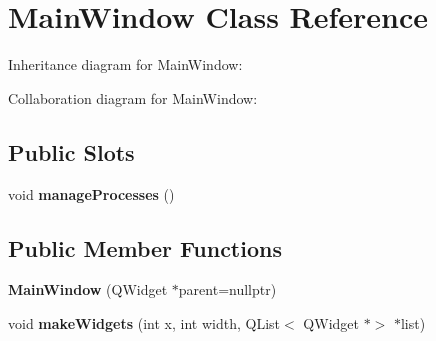 \hypertarget{classMainWindow}{}\section{Main\+Window Class Reference}
\label{classMainWindow}


Inheritance diagram for Main\+Window\+:


Collaboration diagram for Main\+Window\+:
\subsection*{Public Slots}
\begin{DoxyCompactItemize}
\item 
\mbox{\label{classMainWindow_a5a4608a59a2bfb0c1cb373a1c2ac57c7}} 
void {\bfseries manage\+Processes} ()
\end{DoxyCompactItemize}
\subsection*{Public Member Functions}
\begin{DoxyCompactItemize}
\item 
\mbox{\label{classMainWindow_a996c5a2b6f77944776856f08ec30858d}} 
{\bfseries Main\+Window} (Q\+Widget $\ast$parent=nullptr)
\item 
\mbox{\label{classMainWindow_ab6c133bd1931b9e71333e0acaffbaf75}} 
void {\bfseries make\+Widgets} (int x, int width, Q\+List$<$ Q\+Widget $\ast$$>$ $\ast$list)
\end{DoxyCompactItemize}
